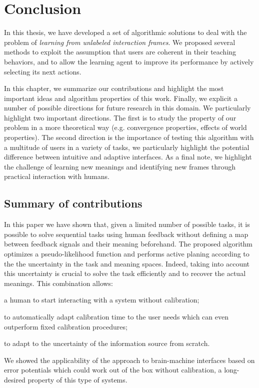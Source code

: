 
\chapter{Conclusion}
\label{chapter:conclusion}
\minitoc

In this thesis, we have developed a set of algorithmic solutions to deal with the problem of \emph{learning from unlabeled interaction frames}. We proposed several methods to exploit the assumption that users are coherent in their teaching behaviors, and to allow the learning agent to improve its performance by actively selecting its next actions.

In this chapter, we summarize our contributions and highlight the most important ideas and algorithm properties of this work. Finally, we explicit a number of possible directions for future research in this domain. We particularly highlight two important directions. The first is to study the property of our problem in a more theoretical way (e.g. convergence properties, effects of world properties). The second direction is the importance of testing this algorithm with a multitude of users in a variety of tasks, we particularly highlight the potential difference between intuitive and adaptive interfaces. As a final note, we highlight the challenge of learning new meanings and identifying new frames through practical interaction with humans.

\section{Summary of contributions}

In this paper we have shown that, given a limited number of possible tasks, it is possible to solve sequential tasks using human feedback without defining a map between feedback signals and their meaning beforehand. The proposed algorithm optimizes a pseudo-likelihood function and performs active planing according to the the uncertainty in the task and meaning spaces. Indeed, taking into account this uncertainty is crucial to solve the task efficiently and to recover the actual meanings. This combination allows: 
\begin{inparaenum}[a)]
\item a human to start interacting with a system without calibration;
\item to automatically adapt calibration time to the user needs which can even outperform fixed calibration procedures; 
\item to adapt to the uncertainty of the information source from scratch.
\end{inparaenum}
We showed the applicability of the approach to brain-machine interfaces based on error potentials which could work out of the box without calibration, a long-desired property of this type of systems. 


